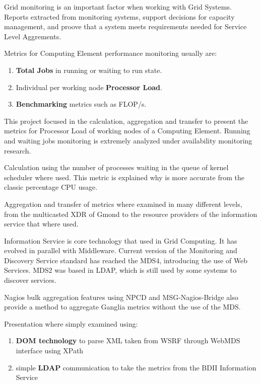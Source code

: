 
Grid monitoring is an important factor when working with Grid Systems. Reports extracted from monitoring systems, support decisions for capacity management, and proove that a system meets requirements needed for Service Level Aggrements.

Metrics for Computing Element performance monitoring usually are:

\begin{enumerate}
 \item {\bf Total Jobs} in running or waiting to run state.
 \item Individual per working node {\bf Processor Load}.
 \item {\bf Benchmarking} metrics such as FLOP/s.
\end{enumerate}

This project focused in the calculation, aggregation and transfer to present the metrics for Processor Load of working nodes of a Computing Element. Running and waiting jobs monitoring is extremely analyzed under availability monitoring research.

Calculation using the number of processes waiting in the queue of kernel scheduler where used. This metric is explained why is more accurate from the classic percentage CPU usage.

Aggregation and transfer of metrics where examined in many different levels, from the multicasted XDR of Gmond to the resource providers of the information service that where used.

Information Service is core technology that used in Grid Computing. It has evolved in parallel with Middleware. Current version of the Monitoring and Discovery Service standard has reached the MDS4, introducing the use of Web Services. MDS2 was based in LDAP, which is still used by some systems to discover services.

Nagios bulk aggregation features using NPCD and MSG-Nagios-Bridge also provide a method to aggregate Ganglia metrics without the use of the MDS.

Presentation where simply examined using:

\begin{enumerate}
 \item {\bf DOM technology} to parse XML taken from WSRF through WebMDS interface using XPath
 \item simple {\bf LDAP} communication to take the metrics from the BDII Information Service
\end{enumerate}


